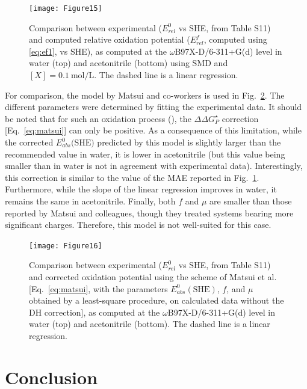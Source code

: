 \documentclass[review,preprint]{elsarticle}
\begin{document}
\begin{figure}[!h]
	\centering
	\texttt{[image: Figure15]}
	\caption{Comparison between experimental ($E^0_{rel} $ vs SHE, from Table S11) and computed relative oxidation potential ($E^f_{rel}$, computed using \eqref{eq:ef1}, vs SHE), as computed at the $\omega$B97X-D/6-311+G(d) level in water (top) and acetonitrile (bottom) using SMD and $[X]=\SI{0.1}{\mole\per\liter}$.  The dashed line is a linear regression.}
	\label{fig:expvstheo}
\end{figure}

For comparison, the model by Matsui and co-workers \cite{matsuiDensityFunctionalTheory2013} is used in Fig.~\ref{fig:matsui}. The different parameters were determined by fitting the experimental data. It should be noted that for such an oxidation process (), the $\Delta\Delta G^\star_P$ correction [Eq.~\eqref{eq:matsui}] can only be positive. As a consequence of this limitation, while the corrected $E^0_{abs}(\text{SHE)}$  predicted by this model is slightly larger than the recommended value in water, it is lower in acetonitrile (but this value being smaller than in water is not in agreement with experimental data). Interestingly, this correction is similar to the value of the MAE reported in Fig.~\ref{fig:expvstheo}. Furthermore, while the slope of the linear regression improves in water, it remains the same in acetonitrile. Finally, both $f$ and $\mu$ are smaller than those reported by Matsui and colleagues, though they treated systems bearing more significant charges. Therefore, this model is not well-suited for this case.


\begin{figure}[!h]
	\centering
	\texttt{[image: Figure16]}
	\caption{Comparison between experimental ($E^0_{rel} $ vs SHE, from Table S11) and corrected oxidation potential using the scheme of Matsui et al. \cite{matsuiDensityFunctionalTheory2013} [Eq.~\eqref{eq:matsui}, with the parameters $E_{abs}^0(\text{SHE})$, $f$, and $\mu$ obtained by a least-square procedure, on calculated data without the DH correction], as computed at the $\omega$B97X-D/6-311+G(d) level in water (top) and acetonitrile (bottom). The dashed line is a linear regression. }
	\label{fig:matsui}
\end{figure}

\clearpage
\section{Conclusion} \label{sec:conclusion}
\end{document}
